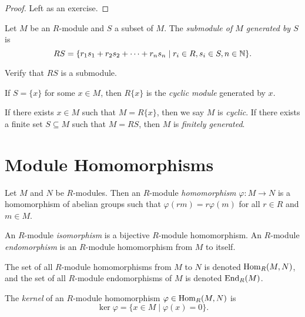 \begin{proof}
  Left as an exercise.
\end{proof}

\begin{definition}
  Let $M$ be an $R$-module and $S$ a subset of $M$. The
  \emph{submodule of $M$ generated by $S$} is
  \[
    RS = \{r_1 s_1 + r_2 s_2 + \dots + r_n s_n \mid r_i \in R, s_i \in S, n \in \mathbb{N}\}
  .\]
\end{definition}

\begin{exercise}
  Verify that $RS$ is a submodule.
\end{exercise}

\begin{example}
  If $S = \{x\}$ for some $x \in M$, then
  $R\{x\}$ is the \emph{cyclic module} generated by $x$.
\end{example}

\begin{definition}
  If there exists $x \in M$ such that $M = R\{x\}$,
  then we say $M$ is \emph{cyclic}. If there exists a
  finite set $S \subseteq M$ such that $M = RS$, then
  $M$ is \emph{finitely generated}.
\end{definition}

\section{Module Homomorphisms}
\begin{definition}
  Let $M$ and $N$ be $R$-modules. Then an $R$-module
  \emph{homomorphism} $\varphi : M \to N$ is a
  homomorphism of abelian groups such that
  $\varphi(rm) = r\varphi(m)$ for all $r \in R$ and
  $m \in M$.
\end{definition}

\begin{definition}
  An $R$-module \emph{isomorphism} is a bijective
  $R$-module homomorphism. An $R$-module
  \emph{endomorphism}
  is an $R$-module homomorphism from $M$ to itself.
\end{definition}

\begin{remark}
  The set of all $R$-module homomorphisms from $M$ to $N$
  is denoted $\operatorname{Hom}_R(M, N)$, and the set of all
  $R$-module endomorphisms of $M$ is denoted
  $\operatorname{End}_R(M)$.
\end{remark}

\begin{definition}
  The \emph{kernel} of an $R$-module homomorphism
  $\varphi \in \operatorname{Hom}_R(M, N)$ is
  \[
    \ker \varphi = \{x \in M \mid \varphi(x) = 0\}.
  \]
\end{definition}

